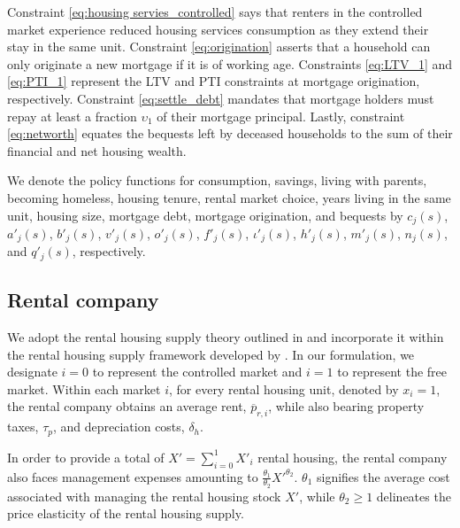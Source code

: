 \documentclass[parskip=full]{article}
\begin{document}
Constraint \eqref{eq:housing servies_controlled} says that renters in the controlled market experience reduced housing services consumption as they extend their stay in the same unit. Constraint \eqref{eq:origination} asserts that a household can only originate a new mortgage if it is of working age. Constraints \eqref{eq:LTV_1} and \eqref{eq:PTI_1} represent the LTV and PTI constraints at mortgage origination, respectively. Constraint \eqref{eq:settle_debt} mandates that mortgage holders must repay at least a fraction $\upsilon_{1}$ of their mortgage principal. Lastly, constraint \eqref{eq:networth} equates the bequests left by deceased households to the sum of their financial and net housing wealth.

We denote the policy functions for consumption, savings, living with parents, becoming homeless, housing tenure, rental market choice, years living in the same unit, housing size, mortgage debt, mortgage origination, and bequests by $c_{j}(s)$, $a'_{j}(s)$, $b'_{j}(s)$, $v'_{j}(s)$, $o'_{j}(s)$, $f'_{j}(s)$, $\iota'_{j}(s)$, $h'_{j}(s)$, $m'_{j}(s)$, $n_{j}(s)$, and $q'_{j}(s)$, respectively.

\subsection{Rental company}\label{sec:rental_company}

We adopt the rental housing supply theory outlined in \citet{fallis-1985} and incorporate it within the rental housing supply framework developed by \citet{garrigaeetal-2009}. In our formulation, we designate $i=0$ to represent the controlled market and $i=1$ to represent the free market. Within each market $i$, for every rental housing unit, denoted by $x_i = 1$, the rental company obtains an average rent, $\overline{p}_{r,i}$, while also bearing property taxes, $\tau_{p}$, and depreciation costs, $\delta_{h}$.

In order to provide a total of $X'=\sum^{1}_{i=0} X'_{i}$ rental housing, the rental company also faces management expenses amounting to $\frac{\theta_{1}}{\theta_{2}}X'^{\theta_{2}}$. $\theta_{1}$ signifies the average cost associated with managing the rental housing stock $X'$, while $\theta_{2}\geq 1$ delineates the price elasticity of the rental housing supply.
\end{document}
